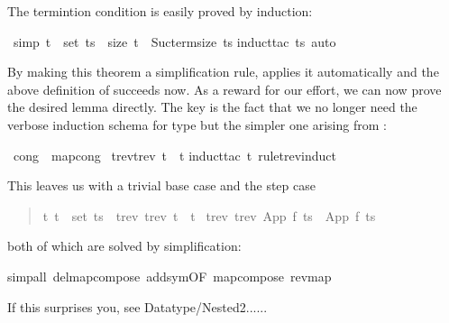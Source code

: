 \begin{isabelle}%
%
\begin{isamarkuptext}%
\noindent
The termintion condition is easily proved by induction:%
\end{isamarkuptext}%
\ {\isacharbrackleft}simp{\isacharbrackright}{\isacharcolon}\ {\isachardoublequote}t\ {\isasymin}\ set\ ts\ {\isasymlongrightarrow}\ size\ t\ {\isacharless}\ Suc{\isacharparenleft}term{\isacharunderscore}size\ ts{\isacharparenright}{\isachardoublequote}\isanewline
{}induct{\isacharunderscore}tac\ ts{\isacharcomma}\ auto{\isacharparenright}%
\begin{isamarkuptext}%
\noindent
By making this theorem a simplification rule, 
applies it automatically and the above definition of 
succeeds now. As a reward for our effort, we can now prove the desired
lemma directly. The key is the fact that we no longer need the verbose
induction schema for type  but the simpler one arising from
:%
\end{isamarkuptext}%
\ {\isacharbrackleft}cong{\isacharbrackright}\ {\isacharequal}\ map{\isacharunderscore}cong\isanewline
{}\ {\isachardoublequote}trev{\isacharparenleft}trev\ t{\isacharparenright}\ {\isacharequal}\ t{\isachardoublequote}\isanewline
{}induct{\isacharunderscore}tac\ t\ rule{\isacharcolon}trev{\isachardot}induct{\isacharparenright}%
\begin{isamarkuptxt}%
\noindent
This leaves us with a trivial base case  and the step case
\begin{quote}

\begin{isabelle}%
{\isasymforall}\mbox{t}{\isachardot}\ \mbox{t}\ {\isasymin}\ set\ \mbox{ts}\ {\isasymlongrightarrow}\ trev\ {\isacharparenleft}trev\ \mbox{t}{\isacharparenright}\ {\isacharequal}\ \mbox{t}\ {\isasymLongrightarrow}\isanewline
trev\ {\isacharparenleft}trev\ {\isacharparenleft}App\ \mbox{f}\ \mbox{ts}{\isacharparenright}{\isacharparenright}\ {\isacharequal}\ App\ \mbox{f}\ \mbox{ts}
\end{isabelle}%

\end{quote}
both of which are solved by simplification:%
\end{isamarkuptxt}%
simp{\isacharunderscore}all\ del{\isacharcolon}map{\isacharunderscore}compose\ add{\isacharcolon}sym{\isacharbrackleft}OF\ map{\isacharunderscore}compose{\isacharbrackright}\ rev{\isacharunderscore}map{\isacharparenright}%
\begin{isamarkuptext}%
\noindent
If this surprises you, see Datatype/Nested2......


\end{isamarkuptext}
\end{isabelle}

